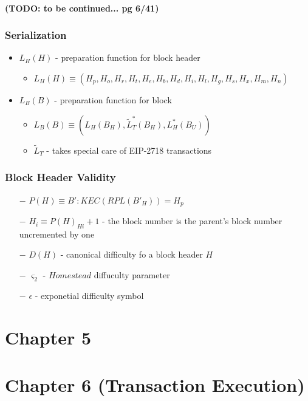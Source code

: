 \documentclass{article}
\begin{document}
\paragraph{(TODO: to be continued... pg 6/41)}

\subsubsection{Serialization}
\begin{itemize}
    \item $L_H(H)$ - preparation function for block header
    \begin{itemize}
        \item $L_H(H) \equiv (H_p, H_o, H_r, H_t, H_e, H_b, H_d, H_i, H_l, H_g, H_s, H_x, H_m, H_n)$
    \end{itemize}
    \item $L_B(B)$ - preparation function for block
    \begin{itemize}
        \item $L_B(B) \equiv (L_H(B_H),\tilde{L}_T^*(B_H), L_H^*(B_U))$
        \item $\tilde{L}_T$ - takes special care of EIP-2718 transactions
    \end{itemize}
\end{itemize}

\subsubsection{Block Header Validity}

\begin{itemize}
    \item[$-$] $P(H) \equiv B' : KEC(RPL(B'_H)) = H_p$ 
    \item[$-$] $H_i \equiv P(H)_{Hi} + 1$ - the block number is the parent's block number uncremented by one 
    \item[$-$] $D(H)$ - canonical difficulty fo a block header $H$ 
    \item[$-$] $\varsigma_{2}$ - $Homestead$ diffuculty parameter
    \item[$-$] $\epsilon$ - exponetial difficulty symbol 
\end{itemize}

\section{Chapter 5}

\section{Chapter 6 (Transaction Execution)}
\end{document}
